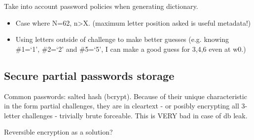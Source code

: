       Take into account password policies when generating dictionary.

      \begin{itemize}
        \item Case where N=62, n>X. (maximum letter position asked is useful metadata!)
        \item Using letters outside of challenge to make better guesses (e.g. knowing \#1=`1', \#2=`2' and \#5=`5', I can make a good guess for 3,4,6 even at w0.)
      \end{itemize}

    \subsection{Secure partial passwords storage}
      \label{ssec:secure_store}
      Common passwords: salted hash (bcrypt). Because of their unique characteristic in the form partial challenges, they are in cleartext - or posibly encrypting all 3-letter challenges - trivially brute forceable. This is VERY bad in case of db leak.

      Reversible encryption as a solution?